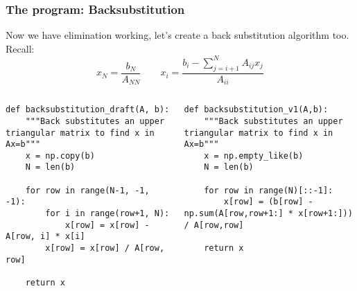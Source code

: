 \begin{frame}[fragile]
  \frametitle{The program: Backsubstitution}
  Now we have elimination working, let's create a back substitution algorithm too. Recall:
  \[
    x_N = \frac{b_N}{A_{NN}} \qquad x_i = \frac{b_i - \sum_{j=i+1}^{N}A_{ij}x_j}{A_{ii}}
 \]
 \begin{columns}[T]
  \begin{lstlisting}[basicstyle=\tiny\ttfamily]
def backsubstitution_draft(A, b):
    """Back substitutes an upper triangular matrix to find x in Ax=b"""
    x = np.copy(b)
    N = len(b)

    for row in range(N-1, -1, -1):
        for i in range(row+1, N):
            x[row] = x[row] - A[row, i] * x[i]
        x[row] = x[row] / A[row, row]  
    
    return x
      \end{lstlisting}\pause
  \begin{lstlisting}[basicstyle=\tiny\ttfamily]
def backsubstitution_v1(A,b):
    """Back substitutes an upper triangular matrix to find x in Ax=b"""
    x = np.empty_like(b)
    N = len(b)
    
    for row in range(N)[::-1]:
        x[row] = (b[row] - np.sum(A[row,row+1:] * x[row+1:])) / A[row,row]

    return x
      \end{lstlisting}
 \end{columns}
\end{frame}

    


